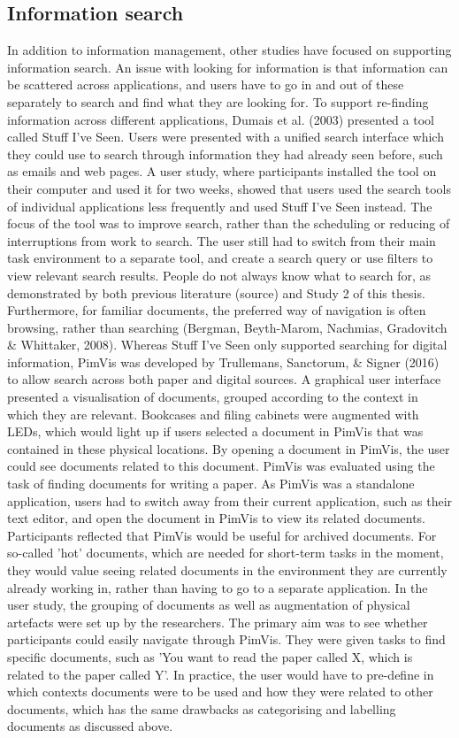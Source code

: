 \subsection{Information search}
In addition to information management, other studies have focused on supporting information search. An issue with looking for information is that information can be scattered across applications, and users have to go in and out of these separately to search and find what they are looking for. To support re-finding information across different applications, Dumais et al. (2003) presented a tool called Stuff I've Seen. Users were presented with a unified search interface which they could use to search through information they had already seen before, such as emails and web pages. A user study, where participants installed the tool on their computer and used it for two weeks, showed that users used the search tools of individual applications less frequently and used Stuff I've Seen instead. The focus of the tool was to improve search, rather than the scheduling or reducing of interruptions from work to search. The user still had to switch from their main task environment to a separate tool, and create a search query or use filters to view relevant search results. People do not always know what to search for, as demonstrated by both previous literature (source) and Study 2 of this thesis. Furthermore, for familiar documents, the preferred way of navigation is often browsing, rather than searching (Bergman, Beyth-Marom, Nachmias, Gradovitch & Whittaker, 2008).
Whereas Stuff I've Seen only supported searching for digital information, PimVis was developed by Trullemans, Sanctorum, & Signer (2016) to allow search across both paper and digital sources. A graphical user interface presented a visualisation of documents, grouped according to the context in which they are relevant. Bookcases and filing cabinets were augmented with LEDs, which would light up if users selected a document in PimVis that was contained in these physical locations. By opening a document in PimVis, the user could see documents related to this document. PimVis was evaluated using the task of finding documents for writing a paper. As PimVis was a standalone application, users had to switch away from their current application, such as their text editor, and open the document in PimVis to view its related documents. Participants reflected that PimVis would be useful for archived documents. For so-called 'hot' documents, which are needed for short-term tasks in the moment, they would value seeing related documents in the environment they are currently already working in, rather than having to go to a separate application. In the user study, the grouping of documents as well as augmentation of physical artefacts were set up by the researchers. The primary aim was to see whether participants could easily navigate through PimVis. They were given tasks to find specific documents, such as 'You want to read the paper called X, which is related to the paper called Y'. In practice, the user would have to pre-define in which contexts documents were to be used and how they were related to other documents, which has the same drawbacks as categorising and labelling documents as discussed above.

